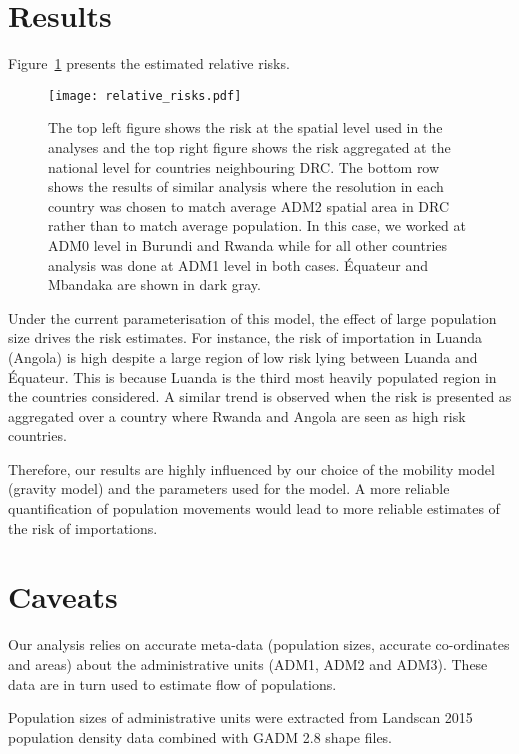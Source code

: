 \documentclass[11pt,]{article}
\begin{document}
\section*{Results}

Figure~\ref{fig:relrisk} presents the estimated relative risks.

\begin{figure}
  \centering
  \texttt{[image: relative\_risks.pdf]}
    \caption[]{The top left figure shows the risk at the spatial level
      used in the analyses and the top right figure shows the risk
      aggregated at the national level for countries neighbouring DRC.
      The bottom row shows the results of similar analysis
  where the resolution in each country was chosen to match average
  ADM2 spatial area in DRC rather than to match average population.
  In this case, we worked at ADM0 level in
  Burundi and Rwanda while for all other countries analysis was done
  at ADM1 level in both cases.
  Équateur  and Mbandaka are shown in dark gray.}
  \label{fig:relrisk}
\end{figure}
\FloatBarrier


Under the current parameterisation of this model, the effect of large population size
drives the risk estimates. For instance, the risk of importation in Luanda
(Angola) is high despite a large region of low risk lying between
Luanda and Équateur. This is because Luanda is the third most
heavily populated region in the countries considered. A similar trend
is observed when the risk is presented as aggregated over a country where Rwanda
and Angola are seen as high risk countries.

Therefore, our results are highly influenced by our choice of the
mobility model (gravity model) and the parameters used for the
model. A more reliable quantification of population movements
would lead to more reliable estimates of the risk of importations.

\section*{Caveats}

Our analysis relies on accurate meta-data (population
sizes, accurate co-ordinates and areas) about  
the administrative units (ADM1, ADM2 and ADM3).
These data are in turn used to estimate flow of populations.

Population sizes  of administrative units were extracted
from Landscan 2015 population density data combined with GADM 2.8 shape files. 
\end{document}
